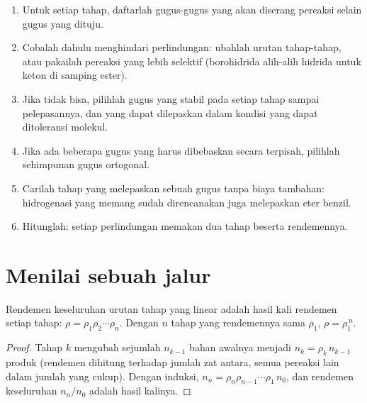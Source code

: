 \begin{method}\label{met:b2:retrosynthesis:protect-in-route}
\begin{enumerate}
  \item Untuk setiap tahap, daftarlah gugus-gugus yang akan diserang
        pereaksi selain gugus yang dituju.
  \item Cobalah dahulu menghindari perlindungan: ubahlah urutan tahap-tahap,
        atau pakailah pereaksi yang lebih selektif (borohidrida alih-alih
        hidrida untuk keton di samping ester).
  \item Jika tidak bisa, pilihlah gugus yang stabil pada setiap tahap sampai
        pelepasannya, dan yang dapat dilepaskan dalam kondisi yang dapat
        ditoleransi molekul.
  \item Jika ada beberapa gugus yang harus dibebaskan secara terpisah,
        pilihlah sehimpunan gugus ortogonal.
  \item Carilah tahap yang melepaskan sebuah gugus tanpa biaya tambahan:
        hidrogenasi yang memang sudah direncanakan juga melepaskan eter
        benzil.
  \item Hitunglah: setiap perlindungan memakan dua tahap beserta rendemennya.
\end{enumerate}
\end{method}

\section{Menilai sebuah jalur}\label{sec:b2:retrosynthesis:judging}

\begin{proposition}\label{prop:b2:retrosynthesis:overall-yield}
Rendemen keseluruhan urutan tahap yang linear adalah hasil kali rendemen
setiap tahap:
$\rho = \rho_1 \rho_2 \cdots \rho_n$. Dengan $n$ tahap yang rendemennya sama $\rho_1$, $\rho = \rho_1^{\,n}$.
\end{proposition}

\begin{proof}
Tahap $k$ mengubah sejumlah $n_{k-1}$ bahan awalnya menjadi $n_k = \rho_k\, n_{k-1}$
produk (rendemen dihitung terhadap jumlah zat antara, semua pereaksi lain
dalam jumlah yang cukup). Dengan induksi,
$n_n = \rho_n \rho_{n-1} \cdots \rho_1\, n_0$, dan rendemen keseluruhan $n_n/n_0$ adalah hasil kalinya.
\end{proof}

